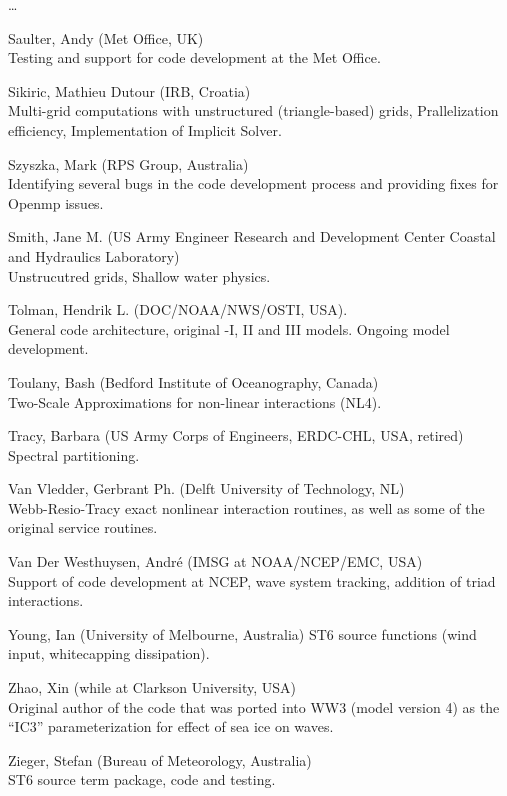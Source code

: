 \begin{list}{\ldots}{ }
\item [Saulter, Andy] (Met Office, UK)\\
Testing and support for code development at the Met Office.

\item [Sikiric, Mathieu Dutour] (IRB, Croatia) \\
  Multi-grid computations with unstructured (triangle-based) grids, Prallelization efficiency, Implementation of Implicit Solver.

\item [Szyszka, Mark] (RPS Group, Australia) \\
  Identifying several bugs in the code development process and providing fixes for Openmp issues.

\item [Smith, Jane M.] (US Army Engineer Research and Development Center Coastal and Hydraulics Laboratory) \\
 Unstrucutred grids, Shallow water physics.

\item [Tolman, Hendrik L.] (DOC/NOAA/NWS/OSTI, USA). \\
  General code architecture, original \wt-I, II and III models. Ongoing model
  development.

\item [Toulany, Bash] (Bedford Institute of Oceanography, Canada)\\
 Two-Scale Approximations for non-linear interactions (NL4).

\item [Tracy, Barbara] (US Army Corps of Engineers, ERDC-CHL, USA, retired) \\
  Spectral partitioning.

\item [Van Vledder, Gerbrant Ph.] (Delft University of Technology, NL) \\
  Webb-Resio-Tracy exact nonlinear interaction routines, as well as some of
  the original service routines.

\item [Van Der Westhuysen, Andr\'e](IMSG at NOAA/NCEP/EMC, USA) \\
  Support of code development at NCEP, wave system tracking, addition of triad interactions.

\item [Young, Ian] (University of Melbourne, Australia)
  ST6 source functions (wind input, whitecapping dissipation).

\item [Zhao, Xin] (while at Clarkson University, USA) \\
  Original author of the code that was ported into WW3 (model version 4) as the ``IC3'' parameterization for effect of sea ice on waves.

\item [Zieger, Stefan] (Bureau of Meteorology, Australia) \\
  ST6 source term package, code and testing.
\end{list}
